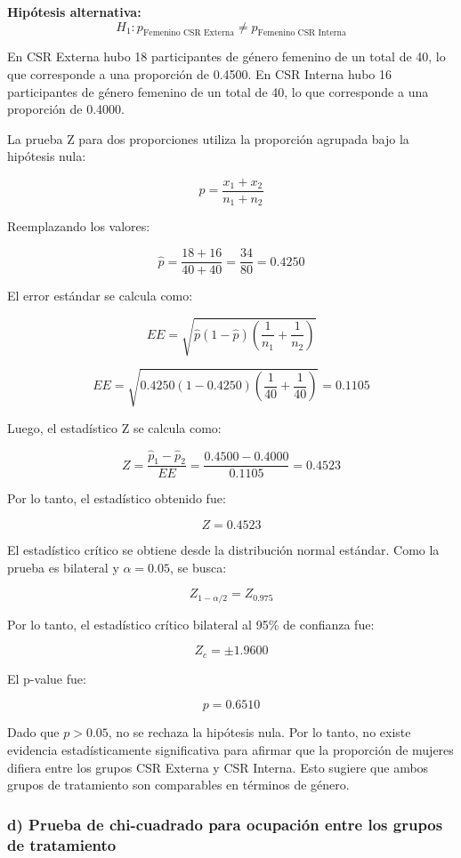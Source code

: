 \documentclass[12pt,letterpaper]{article}
\begin{document}
\textbf{Hipótesis alternativa:}
\[
H_1: p_{\text{Femenino CSR Externa}} \neq p_{\text{Femenino CSR Interna}}
\]

En CSR Externa hubo 18 participantes de género femenino de un total de 40, lo que corresponde a una proporción de 0.4500. En CSR Interna hubo 16 participantes de género femenino de un total de 40, lo que corresponde a una proporción de 0.4000.

La prueba Z para dos proporciones utiliza la proporción agrupada bajo la hipótesis nula:

\[
\hat{p} =
\frac{x_1 + x_2}{n_1 + n_2}
\]

Reemplazando los valores:

\[
\hat{p} =
\frac{18 + 16}{40 + 40}
=
\frac{34}{80}
= 0.4250
\]

El error estándar se calcula como:

\[
EE =
\sqrt{\hat{p}(1-\hat{p})\left(\frac{1}{n_1}+\frac{1}{n_2}\right)}
\]

\[
EE =
\sqrt{0.4250(1-0.4250)\left(\frac{1}{40}+\frac{1}{40}\right)}
= 0.1105
\]

Luego, el estadístico Z se calcula como:

\[
Z =
\frac{\hat{p}_1 - \hat{p}_2}{EE}
=
\frac{0.4500 - 0.4000}{0.1105}
= 0.4523
\]

Por lo tanto, el estadístico obtenido fue:

\[
Z = 0.4523
\]

El estadístico crítico se obtiene desde la distribución normal estándar. Como la prueba es bilateral y \(\alpha = 0.05\), se busca:

\[
Z_{1-\alpha/2} = Z_{0.975}
\]

Por lo tanto, el estadístico crítico bilateral al 95\% de confianza fue:

\[
Z_c = \pm 1.9600
\]

El p-value fue:

\[
p = 0.6510
\]

Dado que \(p > 0.05\), no se rechaza la hipótesis nula. Por lo tanto, no existe evidencia estadísticamente significativa para afirmar que la proporción de mujeres difiera entre los grupos CSR Externa y CSR Interna. Esto sugiere que ambos grupos de tratamiento son comparables en términos de género.

\subsubsection*{d) Prueba de chi-cuadrado para ocupación entre los grupos de tratamiento}
\end{document}
